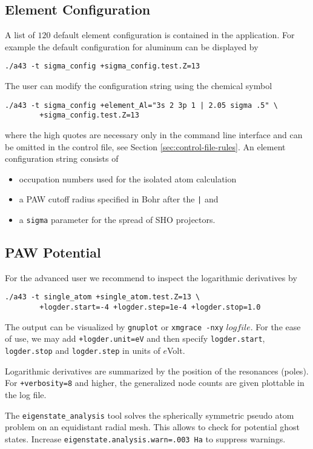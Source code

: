 \documentclass[oribibl]{llncs}
\newcommand{\ttt}[1]{\texttt{#1}}
\begin{document}
\subsection{Element Configuration} \label{sec:sigma-config-short}
%
A list of $120$ default element configuration is contained in the application.
For example the default configuration for aluminum can be displayed by
\begin{verbatim}
./a43 -t sigma_config +sigma_config.test.Z=13
\end{verbatim}
The user can modify the configuration string using the chemical symbol
\begin{verbatim}
./a43 -t sigma_config +element_Al="3s 2 3p 1 | 2.05 sigma .5" \
 		+sigma_config.test.Z=13
\end{verbatim}
where the high quotes are necessary only in the command line interface
and can be omitted in the control file, see Section \ref{sec:control-file-rules}.
%
\noindent
An element configuration string consists of
\begin{itemize}
	\item occupation numbers used for the isolated atom calculation
	\item a \ac{PAW} cutoff radius specified in Bohr after the \ttt{|} and
	\item a \ttt{sigma} parameter for the spread of \ac{SHO} projectors.
\end{itemize}

\subsection{PAW Potential} \label{sec:single-atom}
%
For the advanced user we recommend to inspect the logarithmic derivatives by
\begin{verbatim}
./a43 -t single_atom +single_atom.test.Z=13 \
        +logder.start=-4 +logder.step=1e-4 +logder.stop=1.0
\end{verbatim}
The output can be visualized by \ttt{gnuplot} or \ttt{xmgrace -nxy} $logfile$.
%
\noindent
For the ease of use, we may add \ttt{+logder.unit=eV} and then specify
\ttt{logder.start}, \ttt{logder.stop} and \ttt{logder.step} in units of $e$Volt.

\noindent
Logarithmic derivatives are summarized by the position of the resonances (poles).
For \ttt{+verbosity=8} and higher, the generalized node counts are given plottable in the log file.

\noindent
The \ttt{eigenstate\_analysis} tool solves the spherically symmetric pseudo atom
problem on an equidistant radial mesh. This allows to check for potential ghost states.
Increase \ttt{eigenstate.analysis.warn=.003 Ha} to suppress warnings.
\end{document}

